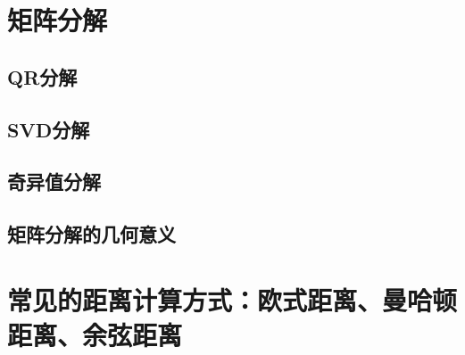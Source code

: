     \section{矩阵分解}
    \subsection{QR分解}
    \subsection{SVD分解}
    \subsection{奇异值分解}
    \subsection{矩阵分解的几何意义}
    \section{常见的距离计算方式：欧式距离、曼哈顿距离、余弦距离}
